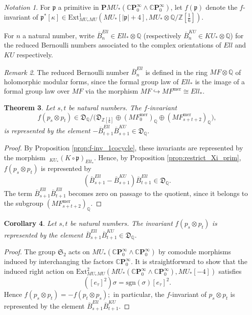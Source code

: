 \documentclass[10pt,a4paper]{amsart}
\newtheorem{thm}{Theorem}[section]
\newtheorem{cor}[thm]{Corollary}
\theoremstyle{definition}
\theoremstyle{remark}
\newtheorem{rem}[thm]{Remark}
\newtheorem{nota}[thm]{Notation}
\newcommand{\qzsix}{{\rat/\zed[{\scriptstyle{\frac{1}{6}}}]}}
\newcommand{\zedsix}{{\zed[{\scriptstyle{\frac{1}{6}}}]}}
\newcommand{\symm}{\mathfrak{S}}
\newcommand{\divBern}{\overline{B}}
\newcommand{\primel}{\mathfrak{p}}
\newcommand{\prim}{\mathbf{P}}
\newcommand{\divcong}{\mathfrak{D}}
\newcommand{\ext}{\mathrm{Ext}}
\newcommand{\zed}{\mathbb{Z}}
\newcommand{\rat}{\mathbb{Q}}
\newcommand{\mf}{{MF}}
\newcommand{\mfmero}{\mf^{\mathrm{mer}}}
\newcommand{\tmf}{{Ell}}
\newcommand{\tmfcoeff}{{Ell}}
\newcommand{\cp}{\mathbb{C} \mathbf{P}^\infty}
\renewcommand{\smash}{\wedge}
\begin{document}
\begin{nota}
For $\primel$ a primitive in $\prim MU_* (\cp_0 \smash \cp_0)$, let $f(\primel)$
denote the $f$-invariant of $ \primel^* [\kappa]\in \ext^1_{MU_*MU}
(MU_*[|\primel| +4] , MU_* \otimes \qzsix)$.
\end{nota}



For $n$ a natural number, write $\divBern_n ^{\tmf}\in \tmfcoeff_* \otimes \rat$ (respectively
$\divBern_n ^{KU} \in KU_* \otimes \rat$) for the reduced Bernoulli numbers associated to the complex
orientations of $\tmf$ and $KU$ respectively.

\begin{rem}
	The reduced Bernoulli number $\divBern_n ^{\tmf}$ is defined in the ring $\mf \otimes \rat$ of holomorphic modular forms, since the formal group law of $\tmfcoeff_*$ is
the image of a formal group law over $\mf$ via the morphism $\mf\hookrightarrow \mfmero\cong \tmfcoeff_*$.
\end{rem}


\begin{thm}
\label{thm:f-pspt}
Let  $s,t$ be natural numbers.
The $f$-invariant $$f(p_s \otimes p_t)
\in \divcong _\rat / \Big(\divcong_\zedsix \oplus (\mfmero_0)_\rat \oplus
(\mfmero_{s+t+2})_\rat \Big),$$  is represented by the element
$
- \divBern_{t+1}^\tmf \divBern _{s+1} ^{KU}
\in
\divcong_\rat.
$
\end{thm}

\begin{proof}
By Proposition \ref{prop:f-inv_1cocycle}, these invariants are represented by the morphism
$
	\ _{KU_*} ( K \circ \primel) _{\tmfcoeff_*}.
$
Hence, by  Proposition \ref{prop:restrict_Xi_prim},
 $f(p_s \otimes p_t)$ is represented by
\[
	 (\divBern_{s+1} ^{\tmf} - \divBern _{s+1} ^{KU}) \divBern_{t+1}^{\tmf}
	\in
\divcong_\rat.
\]
The term $\divBern_{s+1}^{\tmfcoeff} \divBern_{t+1} ^{\tmfcoeff}$ becomes zero on passage to the quotient, since it belongs to
the subgroup $(\mfmero_{s+t+2})_\rat$.
\end{proof}

\begin{cor}
\label{cor:symm_f-invariant}
Let  $s,t$ be natural numbers.
The invariant $f(p_s \otimes p_t)$  is represented by the element
$
 \divBern_{s+1}^\tmf \divBern _{t+1} ^{KU}
\in
\divcong_\rat.
$
\end{cor}

\begin{proof}
The group $\symm_2$ acts on $MU_* (\cp_0 \smash \cp_0)$ by comodule morphisms induced by interchanging the factors $\cp_0$. It is straightforward to show that the induced right action on $\ext_{MU_*MU} ^2 (MU_* (\cp_0 \smash \cp_0) , MU_* [-4]) $ satisfies
\[
	([e_\tau]^2 ) \sigma = \mathrm{sgn} (\sigma) [e_\tau]^2.
\]
Hence
$
	f (p_s \otimes p_t) = - f (p_t \otimes p_s);
$
 in particular, the $f$-invariant of $p_s \otimes p_t$ is  represented by the element $\divBern_{s+1}^\tmf \divBern _{t+1} ^{KU}$.
\end{proof}
\end{document}
